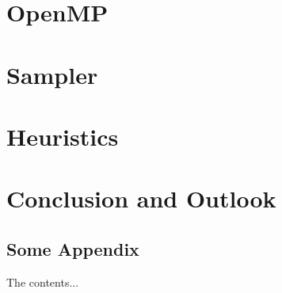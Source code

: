 \documentclass[11pt,a4paper,titlepage]{scrartcl}
\begin{document}
\section{OpenMP}
\section{Sampler}
\section{Heuristics}
\section{Conclusion and Outlook}




\clearpage %
%



\clearpage
\begin{appendices}
\section{Some Appendix} %
The contents...
\end{appendices}
\end{document}
